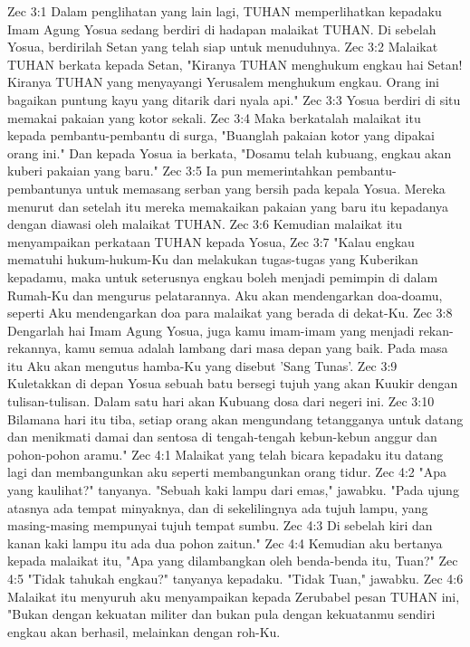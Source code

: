 Zec 3:1  Dalam penglihatan yang lain lagi, TUHAN memperlihatkan kepadaku Imam Agung Yosua sedang berdiri di hadapan malaikat TUHAN. Di sebelah Yosua, berdirilah Setan yang telah siap untuk menuduhnya.
Zec 3:2  Malaikat TUHAN berkata kepada Setan, "Kiranya TUHAN menghukum engkau hai Setan! Kiranya TUHAN yang menyayangi Yerusalem menghukum engkau. Orang ini bagaikan puntung kayu yang ditarik dari nyala api."
Zec 3:3  Yosua berdiri di situ memakai pakaian yang kotor sekali.
Zec 3:4  Maka berkatalah malaikat itu kepada pembantu-pembantu di surga, "Buanglah pakaian kotor yang dipakai orang ini." Dan kepada Yosua ia berkata, "Dosamu telah kubuang, engkau akan kuberi pakaian yang baru."
Zec 3:5  Ia pun memerintahkan pembantu-pembantunya untuk memasang serban yang bersih pada kepala Yosua. Mereka menurut dan setelah itu mereka memakaikan pakaian yang baru itu kepadanya dengan diawasi oleh malaikat TUHAN.
Zec 3:6  Kemudian malaikat itu menyampaikan perkataan TUHAN kepada Yosua,
Zec 3:7  "Kalau engkau mematuhi hukum-hukum-Ku dan melakukan tugas-tugas yang Kuberikan kepadamu, maka untuk seterusnya engkau boleh menjadi pemimpin di dalam Rumah-Ku dan mengurus pelatarannya. Aku akan mendengarkan doa-doamu, seperti Aku mendengarkan doa para malaikat yang berada di dekat-Ku.
Zec 3:8  Dengarlah hai Imam Agung Yosua, juga kamu imam-imam yang menjadi rekan-rekannya, kamu semua adalah lambang dari masa depan yang baik. Pada masa itu Aku akan mengutus hamba-Ku yang disebut 'Sang Tunas'.
Zec 3:9  Kuletakkan di depan Yosua sebuah batu bersegi tujuh yang akan Kuukir dengan tulisan-tulisan. Dalam satu hari akan Kubuang dosa dari negeri ini.
Zec 3:10  Bilamana hari itu tiba, setiap orang akan mengundang tetangganya untuk datang dan menikmati damai dan sentosa di tengah-tengah kebun-kebun anggur dan pohon-pohon aramu."
Zec 4:1  Malaikat yang telah bicara kepadaku itu datang lagi dan membangunkan aku seperti membangunkan orang tidur.
Zec 4:2  "Apa yang kaulihat?" tanyanya. "Sebuah kaki lampu dari emas," jawabku. "Pada ujung atasnya ada tempat minyaknya, dan di sekelilingnya ada tujuh lampu, yang masing-masing mempunyai tujuh tempat sumbu.
Zec 4:3  Di sebelah kiri dan kanan kaki lampu itu ada dua pohon zaitun."
Zec 4:4  Kemudian aku bertanya kepada malaikat itu, "Apa yang dilambangkan oleh benda-benda itu, Tuan?"
Zec 4:5  "Tidak tahukah engkau?" tanyanya kepadaku. "Tidak Tuan," jawabku.
Zec 4:6  Malaikat itu menyuruh aku menyampaikan kepada Zerubabel pesan TUHAN ini, "Bukan dengan kekuatan militer dan bukan pula dengan kekuatanmu sendiri engkau akan berhasil, melainkan dengan roh-Ku.
